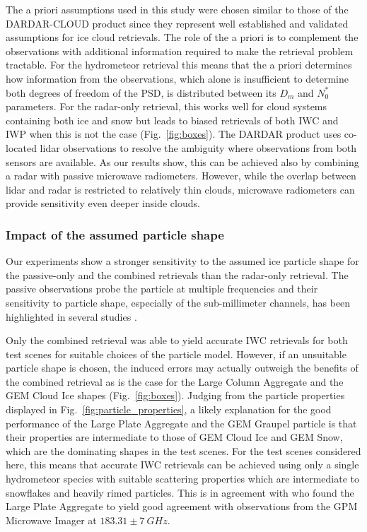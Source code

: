 \documentclass[journal abbreviation, manuscript]{copernicus}
\begin{document}
The a priori assumptions used in this study were chosen similar to those of the
DARDAR-CLOUD product since they represent well established and validated
assumptions for ice cloud retrievals. The role of the a priori is to complement
the observations with additional information required to make the retrieval
problem tractable. For the hydrometeor retrieval this means that the a priori
determines how information from the observations, which alone is insufficient to
determine both degrees of freedom of the PSD, is distributed between its $D_m$
and $N_0^*$ parameters. For the radar-only retrieval, this works well for cloud
systems containing both ice and snow but leads to biased retrievals of both IWC
and IWP when this is not the case (Fig.~\ref{fig:boxes}). The DARDAR product
uses co-located lidar observations to resolve the ambiguity where observations
from both sensors are available. As our results show, this can be achieved also
by combining a radar with passive microwave radiometers. However, while the
overlap between lidar and radar is restricted to relatively thin clouds,
microwave radiometers can provide sensitivity even deeper inside clouds.

\subsubsection{Impact of the assumed particle shape}

Our experiments show a stronger sensitivity to the assumed ice particle shape
for the passive-only and the combined retrievals than the radar-only retrieval.
The passive observations probe the particle at multiple frequencies and their
sensitivity to particle shape, especially of the sub-millimeter channels, has
been highlighted in several studies \citep{ekelund20, fox19}.

Only the combined retrieval was able to yield accurate IWC retrievals for both
test scenes for suitable choices of the particle model. However, if an
unsuitable particle shape is chosen, the induced errors may actually outweigh
the benefits of the combined retrieval as is the case for the Large Column
Aggregate and the GEM Cloud Ice shapes (Fig.~\ref{fig:boxes}). Judging from the
particle properties displayed in Fig.~\ref{fig:particle_properties}, a likely
explanation for the good performance of the Large Plate Aggregate and the GEM
Graupel particle is that their properties are intermediate to those of GEM Cloud
Ice and GEM Snow, which are the dominating shapes in the test scenes. For the
test scenes considered here, this means that accurate IWC retrievals can be
achieved using only a single hydrometeor species with suitable scattering
properties which are intermediate to snowflakes and heavily rimed particles.
This is in agreement with \citet{ekelund20} who found the Large Plate Aggregate
 to yield good agreement with observations from the GPM Microwave Imager at
$183.31 \pm 7\ \unit{GHz}$.
\end{document}
